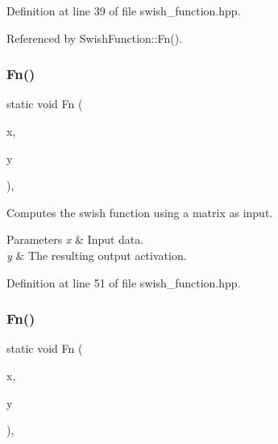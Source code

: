 Definition at line 39 of file swish\+\_\+function.\+hpp.



Referenced by Swish\+Function\+::\+Fn().

\mbox{\label{classmlpack_1_1ann_1_1SwishFunction_ab98eb0966f8d770ad8ce5eb422cc41c0}} 
\subsubsection{Fn()\hspace{0.1cm}{\footnotesize\ttfamily [2/3]}}
{\footnotesize\ttfamily static void Fn (\begin{DoxyParamCaption}\item[{const arma\+::\+Mat$<$ eT $>$ \&}]{x,  }\item[{arma\+::\+Mat$<$ eT $>$ \&}]{y }\end{DoxyParamCaption})\hspace{0.3cm}{\ttfamily [inline]}, {\ttfamily [static]}}



Computes the swish function using a matrix as input. 


\begin{DoxyParams}{Parameters}
{\em x} & Input data. \\
\hline
{\em y} & The resulting output activation. \\
\hline
\end{DoxyParams}


Definition at line 51 of file swish\+\_\+function.\+hpp.

\mbox{\label{classmlpack_1_1ann_1_1SwishFunction_af6cf5da90eb6312e3e25c9b8bd9c3527}} 
\subsubsection{Fn()\hspace{0.1cm}{\footnotesize\ttfamily [3/3]}}
{\footnotesize\ttfamily static void Fn (\begin{DoxyParamCaption}\item[{const Input\+Vec\+Type \&}]{x,  }\item[{Output\+Vec\+Type \&}]{y }\end{DoxyParamCaption})\hspace{0.3cm}{\ttfamily [inline]}, {\ttfamily [static]}}



